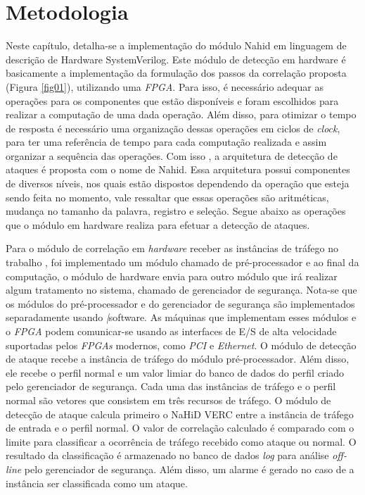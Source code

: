 \chapter[Metodologia]{Metodologia}
\label{metodologia}
Neste capítulo, detalha-se a implementação do módulo Nahid em linguagem de descrição de Hardware SystemVerilog. Este  módulo de detecção em hardware é basicamente a implementação da formulação dos passos da correlação proposta (Figura \ref{fig01}), utilizando uma \textit{FPGA}. Para isso, é necessário adequar  as operações para os componentes que estão disponíveis e foram escolhidos para realizar a computação de uma dada operação.  Além disso, para otimizar o tempo de resposta é necessário uma organização dessas operações em ciclos de \textit{clock}, para ter uma referência de tempo  para cada computação realizada e assim organizar a sequência das operações. Com isso , a arquitetura de detecção de ataques é proposta com o nome de Nahid. Essa arquitetura possui componentes de diversos níveis, nos quais estão dispostos dependendo da operação que esteja sendo feita no momento, vale ressaltar que essas operações são aritméticas, mudança no tamanho da palavra, registro e seleção. Segue abaixo as operações que o módulo em hardware realiza para efetuar a detecção de ataques.

Para o módulo de correlação em \textit{hardware} receber as instâncias de tráfego no trabalho \cite{HOQUE201748}, foi implementado  um módulo  chamado de pré-processador e ao final da computação, o módulo de hardware envia para outro módulo que irá realizar algum tratamento no sistema, chamado de gerenciador de segurança. Nota-se que os módulos do pré-processador e do gerenciador de segurança são implementados separadamente usando \textit|{software}. As máquinas que implementam esses módulos e o \textit{FPGA} podem comunicar-se usando as interfaces de E/S de alta velocidade suportadas pelos \textit{FPGAs} modernos, como \textit{PCI} e \textit{Ethernet}. O módulo de detecção de ataque recebe a instância de tráfego do módulo pré-processador. Além disso, ele recebe o perfil normal e um valor limiar do banco de dados do perfil criado pelo gerenciador de segurança. Cada uma das instâncias de tráfego e o perfil normal são vetores que consistem em três recursos de tráfego. O módulo de detecção de ataque calcula primeiro o NaHiD VERC entre a instância de tráfego de entrada e o perfil normal. O valor de correlação calculado é comparado com o limite para classificar a ocorrência de tráfego recebido como ataque ou normal. O resultado da classificação é armazenado no banco de dados \textit{log} para análise \textit{off-line} pelo gerenciador de segurança. Além disso, um alarme é gerado no caso de a instância ser classificada como um ataque.

